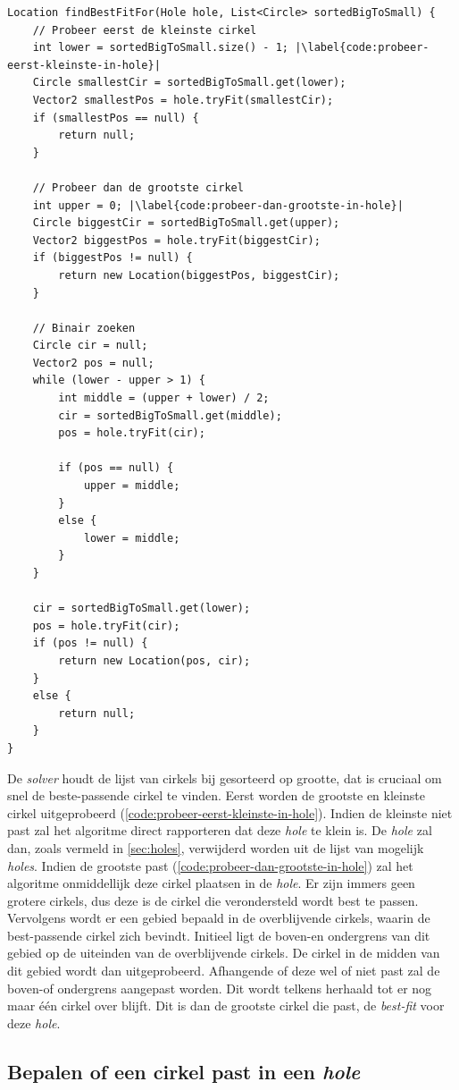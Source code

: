 \documentclass[12pt,a4paper,oneside]{book}
\begin{document}
\begin{lstlisting}
Location findBestFitFor(Hole hole, List<Circle> sortedBigToSmall) {
	// Probeer eerst de kleinste cirkel
	int lower = sortedBigToSmall.size() - 1; |\label{code:probeer-eerst-kleinste-in-hole}|
	Circle smallestCir = sortedBigToSmall.get(lower);
	Vector2 smallestPos = hole.tryFit(smallestCir);
	if (smallestPos == null) {
		return null;
	}

	// Probeer dan de grootste cirkel
	int upper = 0; |\label{code:probeer-dan-grootste-in-hole}|
	Circle biggestCir = sortedBigToSmall.get(upper);
	Vector2 biggestPos = hole.tryFit(biggestCir);
	if (biggestPos != null) {
		return new Location(biggestPos, biggestCir);
	}

	// Binair zoeken
	Circle cir = null;
	Vector2 pos = null;
	while (lower - upper > 1) {
		int middle = (upper + lower) / 2;
		cir = sortedBigToSmall.get(middle);
		pos = hole.tryFit(cir);

		if (pos == null) {
			upper = middle;
		}
		else {
			lower = middle;
		}
	}

	cir = sortedBigToSmall.get(lower);
	pos = hole.tryFit(cir);
	if (pos != null) {
		return new Location(pos, cir);
	}
	else {
		return null;
	}
}
\end{lstlisting}

De \textit{solver} houdt de lijst van cirkels bij gesorteerd op grootte, dat is cruciaal om snel de beste-passende cirkel te vinden.
Eerst worden de grootste en kleinste cirkel uitgeprobeerd (\autoref{code:probeer-eerst-kleinste-in-hole}).
Indien de kleinste niet past zal het algoritme direct rapporteren dat deze \textit{hole} te klein is.
De \textit{hole} zal dan, zoals vermeld in \autoref{sec:holes}, verwijderd worden uit de lijst van mogelijk \textit{holes}.
Indien de grootste past (\autoref{code:probeer-dan-grootste-in-hole}) zal het algoritme onmiddellijk deze cirkel plaatsen in de \textit{hole}.
Er zijn immers geen grotere cirkels, dus deze is de cirkel die verondersteld wordt best te passen.
Vervolgens wordt er een gebied bepaald in de overblijvende cirkels, waarin de best-passende cirkel zich bevindt.
Initieel ligt de boven-en ondergrens van dit gebied op de uiteinden van de overblijvende cirkels.
De cirkel in de midden van dit gebied wordt dan uitgeprobeerd.
Afhangende of deze wel of niet past zal de boven-of ondergrens aangepast worden.
Dit wordt telkens herhaald tot er nog maar één cirkel over blijft.
Dit is dan de grootste cirkel die past, de \textit{best-fit} voor deze \textit{hole}.

\subsection{Bepalen of een cirkel past in een \textit{hole}} \label{subsec:bepalen-of-een-cirkel-past-in-hole}
\end{document}
